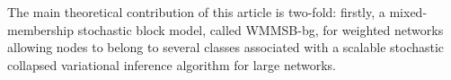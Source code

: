 The main theoretical contribution of this article is two-fold: firstly, a mixed-membership stochastic block model, called WMMSB-bg, for weighted networks allowing nodes to belong to several classes associated with a scalable stochastic collapsed variational inference algorithm for large networks.

%
%
%
%
%
%
%


